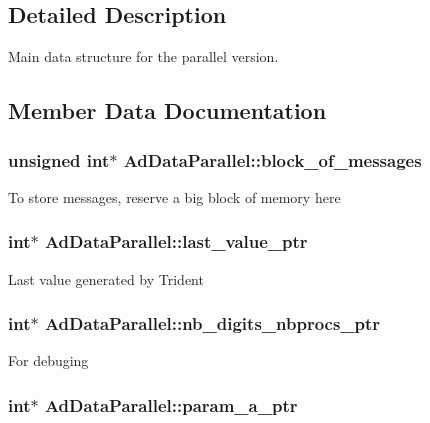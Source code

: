 \subsection{\-Detailed \-Description}
\-Main data structure for the parallel version. 

\subsection{\-Member \-Data \-Documentation}
\hypertarget{classAdDataParallel_a9451414d03458e18a43331bc8eeb9db0}{
\subsubsection[{block\-\_\-of\-\_\-messages}]{\setlength{\rightskip}{0pt plus 5cm}unsigned int$\ast$ {\bf \-Ad\-Data\-Parallel\-::block\-\_\-of\-\_\-messages}}}\label{classAdDataParallel_a9451414d03458e18a43331bc8eeb9db0}
\-To store messages, reserve a big block of memory here \hypertarget{classAdDataParallel_abadd43c4d0470ab910005d8870175427}{
\subsubsection[{last\-\_\-value\-\_\-ptr}]{\setlength{\rightskip}{0pt plus 5cm}int$\ast$ {\bf \-Ad\-Data\-Parallel\-::last\-\_\-value\-\_\-ptr}}}\label{classAdDataParallel_abadd43c4d0470ab910005d8870175427}
\-Last value generated by \-Trident \hypertarget{classAdDataParallel_a9eab29cd926fd30d469875cf539dc7ba}{
\subsubsection[{nb\-\_\-digits\-\_\-nbprocs\-\_\-ptr}]{\setlength{\rightskip}{0pt plus 5cm}int$\ast$ {\bf \-Ad\-Data\-Parallel\-::nb\-\_\-digits\-\_\-nbprocs\-\_\-ptr}}}\label{classAdDataParallel_a9eab29cd926fd30d469875cf539dc7ba}
\-For debuging \hypertarget{classAdDataParallel_adad4cfb99b07d696333c7f9f7dd1bc5c}{
\subsubsection[{param\-\_\-a\-\_\-ptr}]{\setlength{\rightskip}{0pt plus 5cm}int$\ast$ {\bf \-Ad\-Data\-Parallel\-::param\-\_\-a\-\_\-ptr}}}\label{classAdDataParallel_adad4cfb99b07d696333c7f9f7dd1bc5c}
